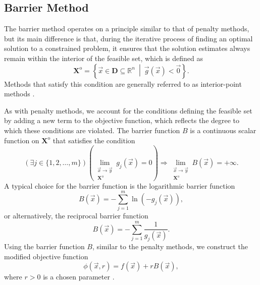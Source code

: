 \subsection{Barrier Method}\label{barrier method}
The barrier method operates on a principle similar to that of penalty methods, but its main difference is that, during the iterative process of finding an optimal solution to a constrained problem, it ensures that the solution estimates always remain within the interior of the feasible set, which is defined as
\begin{equation}
	\mathbf{X}^{\mathrm{o}} = \left\{ \vec{x} \in \mathbf{D} \subseteq \mathbb{R}^n \ \middle| \ \vec{g}(\vec{x}) < \vec{0} \right\}.
\end{equation}
Methods that satisfy this condition are generally referred to as interior-point methods \cite{non-linear-textbook}.

As with penalty methods, we account for the conditions defining the feasible set by adding a new term to the objective function, which reflects the degree to which these conditions are violated. The barrier function $ B $ is a continuous scalar function on $ \mathbf{X}^{\mathrm{o}} $ that satisfies the condition
\begin{equation}
	(\exists j \in \{1,2,\dots,m\})(\lim\limits_{\substack{\vec{x} \to \vec{y} \\ \mathbf{X}^{\mathrm{o}}}} g_j (\vec{x}) = 0) \Rightarrow \lim\limits_{\substack{\vec{x} \to \vec{y} \\ \mathbf{X}^{\mathrm{o}}}} B (\vec{x}) = + \infty.
\end{equation}
A typical choice for the barrier function is the logarithmic barrier function
\begin{equation}\label{eq:log barrier function}
	B (\vec{x}) = -\sum_{j=1}^{m} \ln \left( - g_j (\vec{x}) \right),
\end{equation}
or alternatively, the reciprocal barrier function
\begin{equation}\label{eq:reciprocal barrier function}
	B (\vec{x}) = -\sum_{j=1}^{m} \frac{1}{g_j (\vec{x})}.
\end{equation}
Using the barrier function $ B $, similar to the penalty methods, we construct the modified objective function
\begin{equation}\label{eq:cost function with barrier}
	\phi (\vec{x}, r) = f (\vec{x}) + r B(\vec{x}),
\end{equation}
where $ r > 0 $ is a chosen parameter \cite{non-linear-textbook}.

